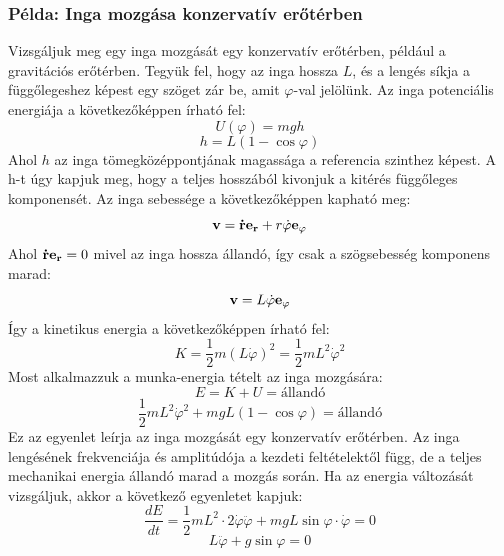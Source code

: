 \documentclass[../main.tex]{subfiles}
\begin{document}
\subsubsection*{Példa: Inga mozgása konzervatív erőtérben}
Vizsgáljuk meg egy inga mozgását egy konzervatív erőtérben, például a gravitációs erőtérben. Tegyük fel, hogy az inga hossza $L$, és a lengés síkja a függőlegeshez képest egy szöget zár be, amit $\varphi$-val jelölünk.
Az inga potenciális energiája a következőképpen írható fel:
\begin{equation}
    U(\varphi) = mgh
\end{equation}
\begin{equation}
    h = L(1 - \cos\varphi)
\end{equation}
Ahol $h$ az inga tömegközéppontjának magassága a referencia szinthez képest. A h-t úgy kapjuk meg, hogy a teljes hosszából kivonjuk a kitérés függőleges komponensét.
Az inga sebessége a következőképpen kapható meg:
\begin{equation}
    \bold{v} = \bold{\dot{r}} \bold{e_r} + r\dot{\varphi} \bold{e_\varphi}
\end{equation}
Ahol $\bold{\dot{r}} \bold{e_r} = 0$ mivel az inga hossza állandó, így csak a szögsebesség komponens marad:
\begin{equation}
    \bold{v} = L\dot{\varphi} \bold{e_\varphi}
\end{equation}
Így a kinetikus energia a következőképpen írható fel:
\begin{equation}
    K = \frac{1}{2} m (L\dot{\varphi})^2 = \frac{1}{2} m L^2 \dot{\varphi}^2
\end{equation}
Most alkalmazzuk a munka-energia tételt az inga mozgására:
\begin{equation}
    E = K + U = \text{állandó}
\end{equation}
\begin{equation}
    \frac{1}{2} m L^2 \dot{\varphi}^2 + mgL(1 - \cos\varphi) = \text{állandó}
\end{equation}
Ez az egyenlet leírja az inga mozgását egy konzervatív erőtérben. Az inga lengésének frekvenciája és amplitúdója a kezdeti feltételektől függ, de a teljes mechanikai energia állandó marad a mozgás során.
Ha az energia változását vizsgáljuk, akkor a következő egyenletet kapjuk:
\begin{equation}
    \frac{dE}{dt} = \frac{1}{2} m L^2 \cdot 2\dot{\varphi}\ddot{\varphi} + mgL \sin\varphi \cdot \dot{\varphi} = 0
\end{equation}
\begin{equation}
    L \ddot{\varphi} + g \sin\varphi = 0
\end{equation}
\end{document}
